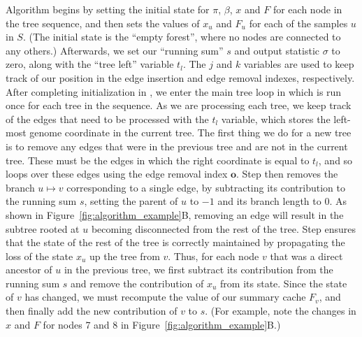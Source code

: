 \documentclass{article}
\newcommand{\indexout}[0]{\ensuremath{\mathbf{o}}}
\begin{document}
Algorithm  begins by setting the initial state for $\pi$, $\beta$,
$x$ and $F$ for each node in the tree sequence, and then sets the values
of $x_u$ and $F_u$ for each of the samples $u$ in $S$.
(The initial state is the ``empty forest'', where no nodes are connected to any others.)
Afterwards, we set our ``running sum'' $s$ and output statistic $\sigma$ to zero, along
with the ``tree left'' variable $t_l$. The $j$ and $k$ variables are
used to keep track of our position in the edge insertion and edge
removal indexes, respectively. After completing initialization in
, we enter the main tree loop in  which is
run once for each tree in the sequence. As we are processing each
tree, we keep track of the edges that need to be processed with
the $t_l$ variable, which stores the left-most genome coordinate
in the current tree. The first thing we do for a new tree is to
remove any edges that were in the previous tree and are not in the
current tree. These must be the edges in which the right coordinate
is equal to $t_l$, and so  loops over these edges using
the edge removal index $\indexout$. Step  then removes
the branch $u \mapsto v$ corresponding to a single edge, by
subtracting its contribution to the running sum $s$, setting the parent of
$u$ to $-1$ and its branch length to $0$. As shown in
Figure~\ref{fig:algorithm_example}B, removing an edge will result
in the subtree rooted at $u$ becoming disconnected from the rest of the
tree. Step  ensures that the state of the rest of the tree
is correctly maintained by propagating the loss of the state $x_u$
up the tree from $v$. Thus, for each node $v$ that was a
direct ancestor of $u$ in the previous tree, we first subtract
its contribution from the running sum $s$ and remove the contribution
of $x_u$ from its state. Since the state of $v$ has changed, we must
recompute the value of our summary cache $F_v$, and then finally
add the new contribution of $v$ to $s$. (For example, note the changes in $x$
and $F$ for nodes 7 and 8 in Figure~\ref{fig:algorithm_example}B.)
\end{document}
